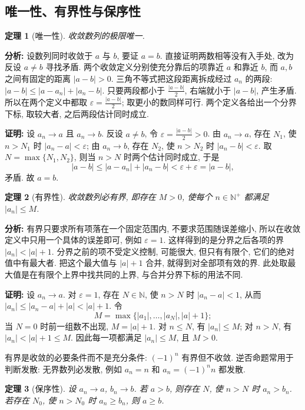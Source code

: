\documentclass[UTF8,openany]{ctexbook}
\theoremstyle{chinesetextbook}
\newtheorem{theorem}{定理}[section]
\newenvironment{cnproof}{\par\indent\textbf{证明:} \ignorespaces}{\par}
\begin{document}
\subsection{唯一性、有界性与保序性}
\begin{theorem}[唯一性]
收敛数列的极限唯一.
\end{theorem}
\par\indent\textbf{分析:} 设数列同时收敛于 $a$ 与 $b$, 要证 $a=b$. 直接证明两数相等没有入手处, 改为反设 $a\ne b$ 寻找矛盾. 两个收敛定义分别使充分靠后的项靠近 $a$ 和靠近 $b$, 而 $a,b$ 之间有固定的距离 $|a-b|>0$. 三角不等式把这段距离拆成经过 $a_n$ 的两段: $|a-b|\le|a-a_n|+|a_n-b|$. 只要两段都小于 $\displaystyle\frac{|a-b|}2$, 右端就小于 $|a-b|$, 产生矛盾. 所以在两个定义中都取 $\displaystyle\varepsilon=\frac{|a-b|}2$; 取更小的数同样可行. 两个定义各给出一个分界下标, 取较大者, 之后两段估计同时成立.
\begin{cnproof}
设 $a_n\to a$ 且 $a_n\to b$. 反设 $a\ne b$, 令 $\displaystyle\varepsilon=\frac{|a-b|}2>0$. 由 $a_n\to a$, 存在 $N_1$, 使 $n>N_1$ 时 $|a_n-a|<\varepsilon$; 由 $a_n\to b$, 存在 $N_2$, 使 $n>N_2$ 时 $|a_n-b|<\varepsilon$. 取 $N=\max\{N_1,N_2\}$, 则当 $n>N$ 时两个估计同时成立, 于是
\[
|a-b|\le|a-a_n|+|a_n-b|<\varepsilon+\varepsilon=|a-b|,
\]
矛盾. 故 $a=b$.
\end{cnproof}
\begin{theorem}[有界性]
收敛数列必有界, 即存在 $M>0$, 使每个 $n\in\mathbb N^+$ 都满足 $|a_n|\le M$.
\end{theorem}
\par\indent\textbf{分析:} 有界只要求所有项落在一个固定范围内, 不要求范围随误差缩小, 所以在收敛定义中只用一个具体的误差即可, 例如 $\varepsilon=1$. 这样得到的是分界之后各项的界 $|a_n|<|a|+1$. 分界之前的项不受定义控制, 可能很大, 但只有有限个, 它们的绝对值中有最大者. 把这个最大值与 $|a|+1$ 合并, 就得到对全部项有效的界. 此处取最大值是在有限个上界中找共同的上界, 与合并分界下标的用法不同.
\begin{cnproof}
设 $a_n\to a$. 对 $\varepsilon=1$, 存在 $N\in\mathbb N$, 使 $n>N$ 时 $|a_n-a|<1$, 从而 $|a_n|\le|a_n-a|+|a|<|a|+1$. 令
\[
M=\max\{|a_1|,\ldots,|a_N|,|a|+1\};
\]
当 $N=0$ 时前一组数不出现, $M=|a|+1$. 对 $n\le N$, 有 $|a_n|\le M$; 对 $n>N$, 有 $|a_n|<|a|+1\le M$. 因此每一项都满足 $|a_n|\le M$, 且 $M>0$.
\end{cnproof}
有界是收敛的必要条件而不是充分条件: $(-1)^n$ 有界但不收敛. 逆否命题常用于判断发散: 无界数列必发散, 例如 $a_n=n$ 和 $a_n=(-1)^nn$ 都发散.
\begin{theorem}[保序性]
设 $a_n\to a$, $b_n\to b$. 若 $a>b$, 则存在 $N$, 使 $n>N$ 时 $a_n>b_n$. 若存在 $N_0$, 使 $n>N_0$ 时 $a_n\ge b_n$, 则 $a\ge b$.
\end{theorem}
\end{document}
